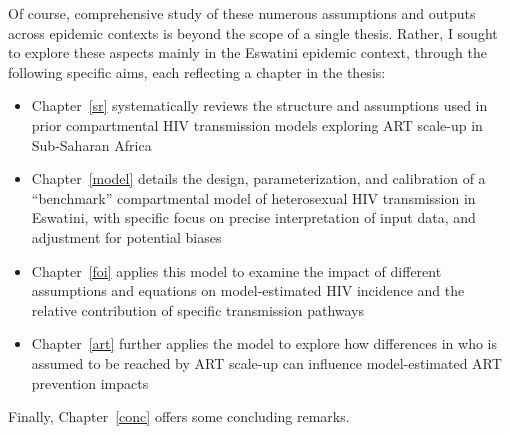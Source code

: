 \par
Of course, comprehensive study of these numerous assumptions and outputs
across epidemic contexts is beyond the scope of a single thesis.
Rather, I sought to explore these aspects mainly in the Eswatini epidemic context,
through the following specific aims, each reflecting a chapter in the thesis:
\begin{itemize}
  \item Chapter~\ref{sr} systematically reviews the structure and assumptions used in
  prior compartmental HIV transmission models exploring ART scale-up in Sub-Saharan Africa
  \item Chapter~\ref{model} details the design, parameterization, and calibration of
  a ``benchmark'' compartmental model of heterosexual HIV transmission in Eswatini,
  with specific focus on precise interpretation of input data, and adjustment for potential biases
  \item Chapter~\ref{foi} applies this model to examine
  the impact of different assumptions and equations on
  model-estimated HIV incidence and the relative contribution of specific transmission pathways
  \item Chapter~\ref{art} further applies the model to explore
  how differences in who is assumed to be reached by ART scale-up
  can influence model-estimated ART prevention impacts
\end{itemize}
Finally, Chapter~\ref{conc} offers some concluding remarks.
